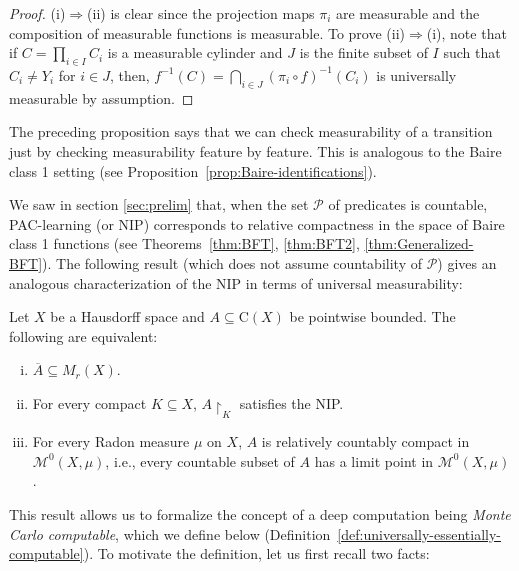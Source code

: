 \begin{proof}
    (i)$\Rightarrow$(ii) is clear since the projection maps $\pi_i$ are measurable and the composition of measurable functions is measurable.
    To prove (ii)$\Rightarrow$(i), note that if $C=\prod_{i\in I}C_i$ is a measurable cylinder and $J$ is the finite subset of $I$ such that $C_i\neq Y_i$ for $i\in J$, then, $f^{-1}(C)=\bigcap_{i\in J}(\pi_i\circ f)^{-1}(C_i)$ is universally measurable by assumption.
\end{proof}

The preceding proposition says that we can check measurability of a transition just by checking measurability feature by feature.
This is analogous to the Baire class 1 setting (see Proposition~\ref{prop:Baire-identifications}).

We saw in section \ref{sec:prelim} that, when the set $\mathcal{P}$ of predicates is countable, PAC-learning (or NIP) corresponds to relative compactness in the space of Baire class 1 functions (see Theorems~\ref{thm:BFT}, \ref{thm:BFT2}, \ref{thm:Generalized-BFT}).
The following result (which does not assume countability of $\mathcal{P}$) gives an analogous characterization of the NIP in terms of universal measurability:

\begin{theorem}
\label{thm:BFT-2F}
    Let $X$ be a Hausdorff space and $A\subseteq \mathrm{C}(X)$ be pointwise bounded.
    The following are equivalent:
    \begin{enumerate}[(i)]
        \item $\overline{A}\subseteq M_r(X)$.
        \item For every compact $K\subseteq X$, $A\restriction_K$ satisfies the NIP.
        \item For every Radon measure $\mu$ on $X$, $A$ is relatively countably compact in $\mathscr{M}^0(X,\mu)$, i.e., every countable subset of $A$ has a limit point in $\mathscr{M}^0(X,\mu)$.
    \end{enumerate}
\end{theorem}

This result allows us to formalize the concept of a deep computation being \emph{Monte Carlo computable}, which we define below (Definition~\ref{def:universally-essentially-computable}).
To motivate the definition, let us first recall two facts:

